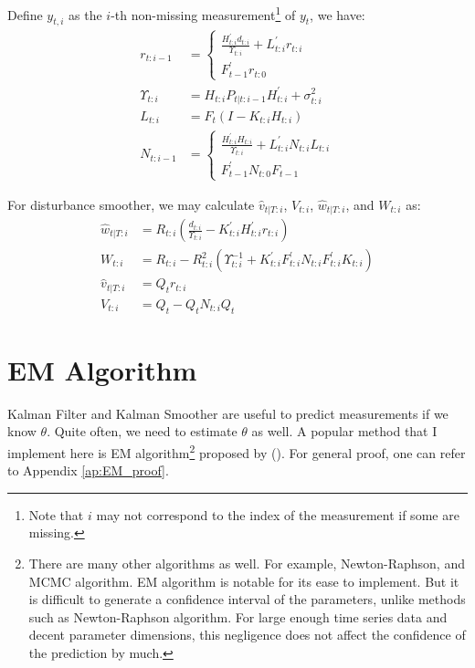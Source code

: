 \documentclass[12pt]{article}
\numberwithin{equation}{section}
\begin{document}
Define $y_{t,i}$ as the $i$-th non-missing measurement\footnote{Note that $i$ may not correspond to the index of the measurement if some are missing.} of $y_t$, we have:
\begin{align}
    r_{t:i-1} &= \begin{cases}
        \frac{H_{t:i}^{'}d_{t:i}}{\Upsilon_{t:i}} + L_{t:i}^{'}r_{t:i} \\
        F_{t-1}^{'}r_{t:0} 
    \end{cases} \label{eq:seq_r} \\
    \Upsilon_{t:i} &= H_{t:i}P_{t|t:i-1}H_{t:i}^{'}+\sigma_{t:i}^2 \nonumber \\
    L_{t:i} &= F_t(I-K_{t:i}H_{t:i}) \nonumber \\
    N_{t:i-1} &= \begin{cases}
        \frac{H_{t:i}^{'}H_{t:i}}{\Upsilon_{t:i}} + L_{t:i}^{'}N_{t:i}L_{t:i} \\
        F_{t-1}^{'}N_{t:0}F_{t-1}
    \end{cases} \label{eq:N_seq}
\end{align}

For disturbance smoother, we may calculate $\hat{v}_{t|T:i}$, $V_{t:i}$, $\hat{w}_{t|T:i}$, and $W_{t:i}$ as:
\begin{align}
    \hat{w}_{t|T:i} &= R_{t:i}(\frac{d_{t:i}}{\Upsilon_{t:i}}-K_{t:i}^{'}H_{t:i}^{'}r_{t:i}) \\
    W_{t:i} &= R_{t:i} - R_{t:i}^2(\Upsilon_{t:i}^{-1}+K_{t:i}^{'}F_{t:i}^{'}N_{t:i}F_{t:i}^{'}K_{t:i})  \\
    \hat{v}_{t|T:i} &= Q_tr_{t:i} \\
    V_{t:i} &= Q_t - Q_tN_{t:i}Q_t
\end{align}

\section{EM Algorithm} \label{sec:EM}
Kalman Filter and Kalman Smoother are useful to predict measurements if we know $\theta$. Quite often, we need to estimate $\theta$ as well. A popular method that I implement here is EM algorithm\footnote{There are many other algorithms as well. For example, Newton-Raphson, and MCMC algorithm. EM algorithm is notable for its ease to implement. But it is difficult to generate a confidence interval of the parameters, unlike methods such as Newton-Raphson algorithm. For large enough time series data and decent parameter dimensions, this negligence does not affect the confidence of the prediction by much.} proposed by (\cite{shumway_stoffer_1982}). For general proof, one can refer to Appendix \ref{ap:EM_proof}.
\end{document}
